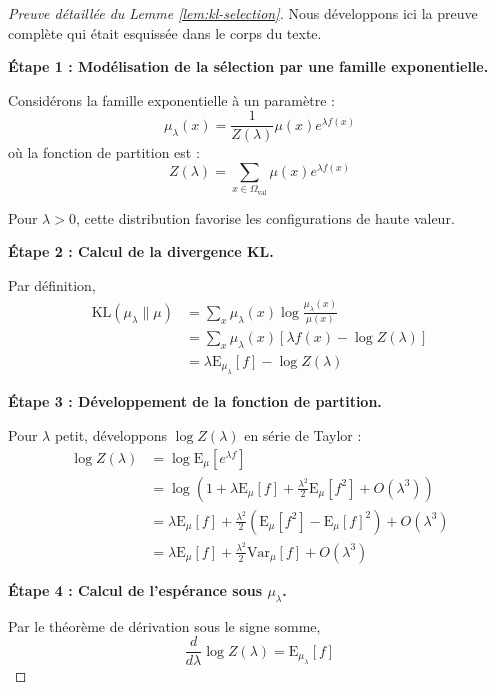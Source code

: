 \documentclass[12pt,a4paper]{article}
\theoremstyle{definition}
\theoremstyle{remark}
\newcommand{\E}{\text{E}}
\newcommand{\Var}{\text{Var}}
\newcommand{\KL}{\text{KL}}
\begin{document}
\begin{proof}[Preuve détaillée du Lemme \ref{lem:kl-selection}]
Nous développons ici la preuve complète qui était esquissée dans le corps du texte.

\textbf{Étape 1 : Modélisation de la sélection par une famille exponentielle.}

Considérons la famille exponentielle à un paramètre :
\begin{equation}
	\mu_\lambda(x) = \frac{1}{Z(\lambda)} \mu(x) e^{\lambda f(x)}
\end{equation}
où la fonction de partition est :
\begin{equation}
	Z(\lambda) = \sum_{x\in\Omega_{\text{val}}} \mu(x) e^{\lambda f(x)}
\end{equation}

Pour $\lambda > 0$, cette distribution favorise les configurations de haute valeur.

\textbf{Étape 2 : Calcul de la divergence KL.}

Par définition,
\begin{align}
	\KL(\mu_\lambda \| \mu) &= \sum_x \mu_\lambda(x) \log\frac{\mu_\lambda(x)}{\mu(x)} \\
	&= \sum_x \mu_\lambda(x) \left[\lambda f(x) - \log Z(\lambda)\right] \\
	&= \lambda \E_{\mu_\lambda}[f] - \log Z(\lambda)
\end{align}

\textbf{Étape 3 : Développement de la fonction de partition.}

Pour $\lambda$ petit, développons $\log Z(\lambda)$ en série de Taylor :
\begin{align}
	\log Z(\lambda) &= \log \E_\mu[e^{\lambda f}] \\
	&= \log\left(1 + \lambda \E_\mu[f] + \frac{\lambda^2}{2}\E_\mu[f^2] + O(\lambda^3)\right) \\
	&= \lambda \E_\mu[f] + \frac{\lambda^2}{2}(\E_\mu[f^2] - \E_\mu[f]^2) + O(\lambda^3) \\
	&= \lambda \E_\mu[f] + \frac{\lambda^2}{2}\Var_\mu[f] + O(\lambda^3)
\end{align}

\textbf{Étape 4 : Calcul de l'espérance sous $\mu_\lambda$.}

Par le théorème de dérivation sous le signe somme,
\begin{equation}
	\frac{d}{d\lambda} \log Z(\lambda) = \E_{\mu_\lambda}[f]
\end{equation}


\end{proof}
\end{document}
